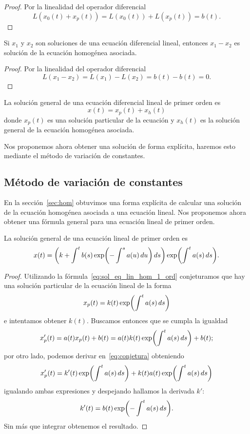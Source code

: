 \documentclass[../ecuaciones_diferenciales.tex]{subfiles}
\begin{document}
\begin{proof}
	Por la linealidad del operador diferencial
	\[L(x_0(t) + x_p(t)) = L(x_0(t)) + L(x_p(t)) = b(t).\]
\end{proof}

\begin{lemma}
	Si \(x_1\) y \(x_2\) son soluciones de una ecuación diferencial lineal,
	entonces \(x_1 - x_2\) es solución de la ecuación homogénea asociada.
\end{lemma}

\begin{proof}
	Por la linealidad del operador diferencial
	\[L(x_1 - x_2) = L(x_1) - L(x_2) = b(t) - b(t) = 0.\]
\end{proof}

\begin{corollary}
	La solución general de una ecuación diferencial lineal de primer orden es
	\[x(t) = x_p(t) + x_h(t)\]
	donde \(x_p(t)\) es una solución particular de la ecuación y \(x_h(t)\) es
	la solución general de la ecuación homogénea asociada.
\end{corollary}

Nos proponemos ahora obtener una solución de forma explícita, haremos esto
mediante el método de variación de constantes.

\subsection{Método de variación de constantes}

En la sección~\ref{sec:hom} obtuvimos una forma explícita de calcular una
solución de la ecuación homogénea asociada a una ecuación lineal. Nos proponemos ahora obtener una fórmula
general para una ecuación lineal de primer orden.

\begin{theorem}
	La solución general de una ecuación lineal de primer orden es
	\begin{equation}\label{eq:sol_lin_1_ord}
		x(t) = \parens{k + \int^t b(s) \expf{-\int^s a(u) \dif u} \dif s} \expf{\int^t a(s) \dif s}.
	\end{equation}
\end{theorem}

\begin{proof}
Utilizando la fórmula~\eqref{eq:sol_eq_lin_hom_1_ord} conjeturamos que hay una solución particular de la
ecuación lineal de la forma
\begin{equation}\label{eq:conjetura}
	x_p(t) = k(t) \expf{\int^t a(s) \dif s}
\end{equation}
e intentamos obtener \(k(t)\). Buscamos entonces que se cumpla la igualdad
\[x'_p(t) = a(t)x_p(t) + b(t) = a(t)k(t) \expf{\int^t a(s) \dif s} + b(t);\]
por otro lado, podemos derivar en~\eqref{eq:conjetura} obteniendo
\[x'_p(t) = k'(t) \expf{\int^t a(s) \dif s} + k(t)a(t) \expf{\int^t a(s) \dif s}\]
igualando ambas expresiones y despejando hallamos la derivada \(k'\):
\[k'(t) = b(t)\expf{-\int^t a(s) \dif s}.\]
Sin más que integrar obtenemos el resultado.
\end{proof}
\end{document}
